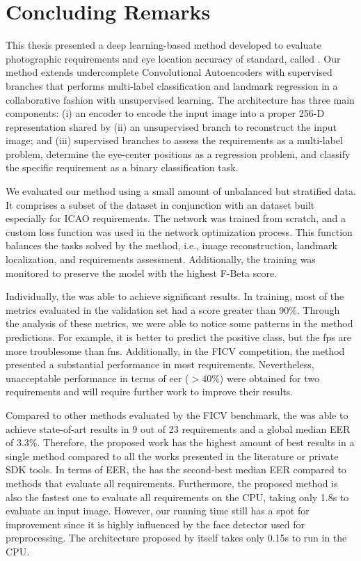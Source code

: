 \section{Concluding Remarks}

This thesis presented a deep learning-based method developed to evaluate photographic requirements and eye location accuracy of \icao standard, called \methodname. Our method extends undercomplete Convolutional Autoencoders with supervised branches that performs multi-label classification and landmark regression in a collaborative fashion with unsupervised learning. The architecture has three main components: (i) an encoder to encode the input image into a proper 256-D representation shared by (ii) an unsupervised branch to reconstruct the input image; and (iii) supervised branches to assess the requirements as a multi-label problem, determine the eye-center positions as a regression problem, and classify the specific \pixelation requirement as a binary classification task.

We evaluated our method using a small amount of unbalanced but stratified data. It comprises a subset of the \ficvtest dataset in conjunction with an \adhoc dataset built especially for ICAO requirements. The network was trained from scratch, and a custom loss function was used in the network optimization process. This function balances the tasks solved by the method, i.e., image reconstruction, landmark localization, and requirements assessment. Additionally, the training was monitored to preserve the model with the highest F-Beta score.

Individually, the \methodname was able to achieve significant results. In training, most of the metrics evaluated in the validation set had a score greater than 90\%. Through the analysis of these metrics, we were able to notice some patterns in the method predictions. For example, it is better to predict the positive class, but the \aclp{fp} are more troublesome than \aclp{fn}. Additionally, in the FICV competition, the method presented a substantial performance in most requirements. Nevertheless, unacceptable performance in terms of \acs{eer} ($> 40\%$) were obtained for two requirements and will require further work to improve their results.

Compared to other methods evaluated by the FICV benchmark, the \methodname was able to achieve state-of-art results in 9 out of 23 requirements and a global median EER of 3.3\%. Therefore, the proposed work has the highest amount of best results in a single method compared to all the works presented in the literature or private SDK tools. In terms of EER, the \methodname has the second-best median EER compared to methods that evaluate all requirements. Furthermore, the proposed method is also the fastest one to evaluate all requirements on the CPU, taking only 1.8s to evaluate an input image. However, our running time still has a spot for improvement since it is highly influenced by the face detector used for preprocessing. The architecture proposed by itself takes only 0.15s to run in the CPU.

